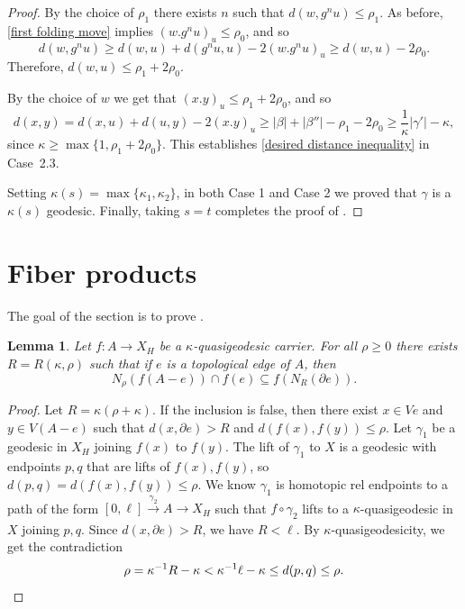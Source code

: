 \documentclass[article, 12pt]{amsart}
\numberwithin{equation}{section}
\newtheorem{lemma}[theorem]{Lemma}
\theoremstyle{definition}
\newcommand{\ii}{^{-1}}
\begin{document}
\begin{proof}
    By the choice of $\rho_1$ there exists $n$ such that $d(w,g^nu)\le \rho_1$.
    As before, \ref{first folding move} implies $(w.g^nu)_u\le \rho_0$, 
    and so
    $$d(w,g^n u) \ge  d(w,u)+d(g^nu,u)-2(w.g^nu)_u\ge d(w,u)-2\rho_0.$$
    Therefore, $d(w,u)\le \rho_1 + 2\rho_0$.

    By the choice of $w$ we get that $(x.y)_u \le \rho_1+2\rho_0$,
    and so 
    $$d(x,y)= d(x,u)+d(u,y)-2(x.y)_u\ge |\beta|+|\beta''|-\rho_1-2\rho_0\geq \frac 1\kappa|\gamma'|-\kappa,$$
    since $\kappa\ge \max\{1,\rho_1+2\rho_0\}$.
    This establishes \eqref{desired distance inequality} in {Case~2.3}.
    
    Setting $\kappa(s) = \max\{\kappa_1,\kappa_2\}$, in both Case 1 and Case 2 we proved that $\gamma$ is a $\kappa(s)$ geodesic. 
    Finally, taking $s=t$ completes the proof of .
\end{proof}

\section{Fiber products}\label{sec:fiber product section}
    The goal of the section is to prove . 

\begin{lemma}\label{distance from edges}
    Let $f:A\to X_H$ be a $\kappa$-quasigeodesic carrier.
    For all $\rho\ge 0$ there exists $R=R(\kappa,\rho)$ such that if $e$ is a topological edge of $A$, then $$N_\rho(f(A-e)) \cap f(e) \subseteq f(N_R(\partial e)).$$ 
\end{lemma}

\begin{proof}
    Let $R = \kappa(\rho+\kappa)$. 
    If the inclusion is false, then there exist $x\in Ve$ and $y\in V(A-e)$ such that $d(x,\partial e)>R$ and $d(f(x),f(y))\leq \rho$.
    Let $\gamma_1$ be a geodesic in $X_H$ joining $f(x)$ to $f(y)$. 
    The lift of $\gamma_1$ to $X$ is a geodesic with endpoints $p, q$ that are lifts of $f(x),f(y)$, so $d(p,q)= d(f(x),f(y))\le \rho$.
    We know $\gamma_1$ is homotopic rel endpoints to a path of the form $[0,\ell]\xrightarrow[]{\gamma_2} A\to X_H$ such that $f\circ \gamma_2$ lifts to a $\kappa$-quasigeodesic in $X$ joining $p,q$.
    Since $d(x,\partial e)>R$, we have $R<\ell$. 
    By $\kappa$-quasigeodesicity, we get the contradiction
    $$\rho=\kappa\ii R -\kappa< \kappa\ii \ell - \kappa \le d(p,q)\le \rho. \qedhere$$
\end{proof}
\end{document}
